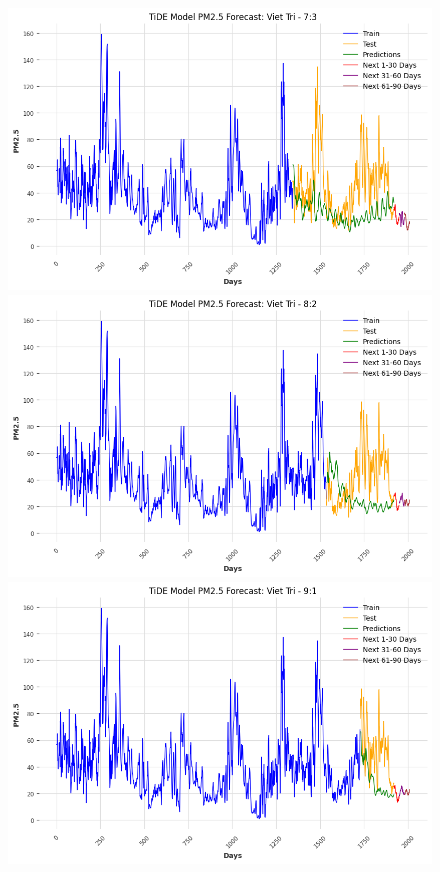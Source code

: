 \begin{figure}[H]
{\begin{adjustbox}{minipage=0.48\textwidth}
\begin{minipage}{0.3\textwidth}
            \end{minipage}\hfill
            \begin{minipage}{0.3\textwidth}
                \centering
                \includegraphics[width=\textwidth]{img/final/TiDE/90D/TiDE_7_3_VT.png}\\
                \includegraphics[width=\textwidth]{img/final/TiDE/90D/TiDE_8_2_VT.png}\\
                \includegraphics[width=\textwidth]{img/final/TiDE/90D/TiDE_9_1_VT.png}

\end{minipage}
\end{adjustbox}}
\end{figure}
